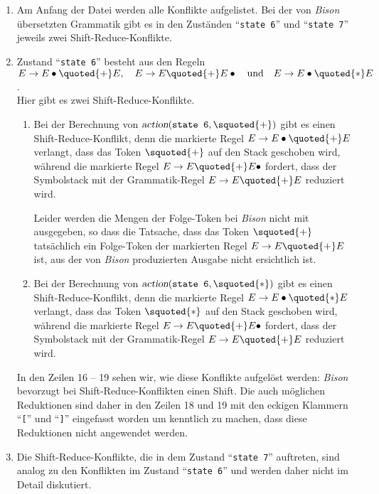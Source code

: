 \begin{enumerate}
\item Am Anfang der Datei werden alle Konflikte aufgelistet.
      Bei der von \textsl{Bison} \"ubersetzten Grammatik gibt es in den Zust\"anden ``\texttt{state 6}'' 
      und ``\texttt{state 7}'' jeweils zwei 
      Shift-Reduce-Konflikte.
\item Zustand ``\texttt{state 6}'' besteht aus den Regeln 
      \\[0.2cm]
      \hspace*{1.3cm}
      $E \rightarrow E \bullet \quoted{+} E,\quad E \rightarrow E \quoted{+} E \bullet \quad \mbox{und} \quad
       E \rightarrow E \bullet \quoted{*} E$.
      \\[0.2cm]
      Hier gibt es zwei Shift-Reduce-Konflikte.
      \begin{enumerate}
      \item Bei der Berechnung von $\textsl{action}(\texttt{state 6}, \squoted{+})$ gibt es einen
            Shift-Reduce-Konflikt, denn die markierte Regel $E \rightarrow E \bullet \quoted{+} E$
            verlangt, dass das Token $\squoted{+}$ auf den Stack geschoben wird, w\"ahrend die markierte
            Regel $E \rightarrow E \quoted{+} E \bullet$ fordert, dass der Symbolstack mit der Grammatik-Regel 
            $E \rightarrow E \quoted{+} E$ reduziert wird.

            Leider werden die Mengen der Folge-Token bei \textsl{Bison} nicht mit ausgegeben, so dass
            die Tatsache, dass das Token $\squoted{+}$ tats\"achlich ein Folge-Token der markierten Regel
            $E \rightarrow E \quoted{+} E$ ist, aus der von \textsl{Bison} produzierten Ausgabe nicht
            ersichtlich ist.
      \item Bei der Berechnung von $\textsl{action}(\texttt{state 6}, \squoted{*})$ gibt es einen
            Shift-Reduce-Konflikt, denn die markierte Regel $E \rightarrow E \bullet \quoted{*} E$
            verlangt, dass das Token $\squoted{*}$ auf den Stack geschoben wird, w\"ahrend die markierte
            Regel $E \rightarrow E \quoted{+} E \bullet$ fordert, dass der Symbolstack mit der Grammatik-Regel 
            $E \rightarrow E \quoted{+} E$ reduziert wird.
      \end{enumerate}
      In den Zeilen 16 -- 19 sehen wir, wie diese Konflikte aufgel\"ost werden:  \textsl{Bison}
      bevorzugt bei Shift-Reduce-Konflikten einen Shift.  Die auch m\"oglichen Reduktionen sind daher
      in den Zeilen 18 und 19 mit den eckigen Klammern ``\texttt{[}'' und ``\texttt{]}'' eingefasst worden um
      kenntlich zu machen, dass diese Reduktionen nicht angewendet werden.
\item Die Shift-Reduce-Konflikte, die in dem Zustand ``\texttt{state 7}'' auftreten, sind analog
      zu den Konflikten im Zustand ``\texttt{state 6}'' und werden daher nicht im Detail diskutiert.
\end{enumerate}

